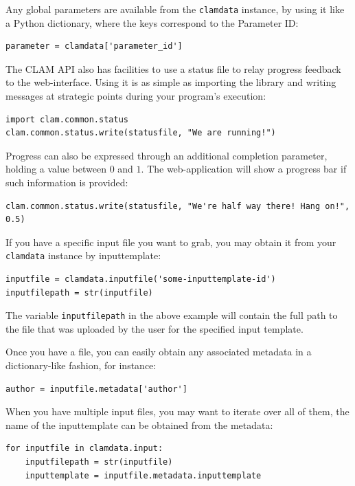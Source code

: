 \documentclass[a4paper,12pt]{report}
\begin{document}
Any global parameters are available from the \texttt{clamdata} instance, by
using it like a Python dictionary, where the keys correspond to the Parameter ID:

\begin{verbatim}
parameter = clamdata['parameter_id']
\end{verbatim}

The CLAM API also has facilities to use a status file to relay progress
feedback to the web-interface. Using it is as simple as importing the library
and writing messages at strategic points during your program's execution:

\begin{verbatim}
import clam.common.status
clam.common.status.write(statusfile, "We are running!")
\end{verbatim}

Progress can also be expressed through an additional completion parameter,
holding a value between $0$ and $1$. The web-application will show a progress bar if
such information is provided:

\begin{verbatim}
clam.common.status.write(statusfile, "We're half way there! Hang on!", 0.5)
\end{verbatim}

If you have a specific input file you want to grab, you may obtain it from your
\texttt{clamdata} instance by inputtemplate:

\begin{verbatim}
inputfile = clamdata.inputfile('some-inputtemplate-id')
inputfilepath = str(inputfile) 
\end{verbatim}

The variable \texttt{inputfilepath} in the above example will contain the full
path to the file that was uploaded by the user for the specified input
template. 

Once you have a file, you can easily obtain any associated metadata in a
dictionary-like fashion, for instance:

\begin{verbatim}
author = inputfile.metadata['author']
\end{verbatim}

When you have multiple input files, you may want to iterate over all of them,
the name of the inputtemplate can be obtained from the metadata:

\begin{verbatim}
for inputfile in clamdata.input:
    inputfilepath = str(inputfile)
    inputtemplate = inputfile.metadata.inputtemplate
\end{verbatim}
  
\end{document}

